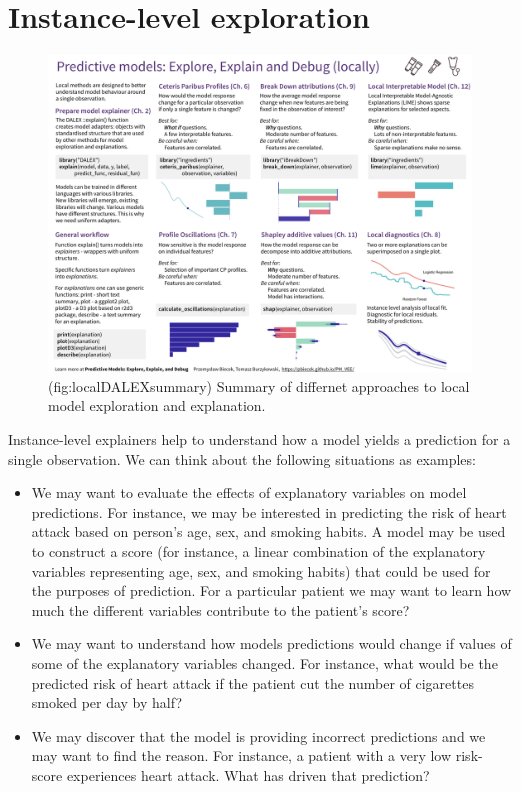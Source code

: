\documentclass[12pt,]{krantz}
\providecommand{\tightlist}{%
  \setlength{\itemsep}{0pt}\setlength{\parskip}{0pt}}
\begin{document}
\hypertarget{InstanceLevelExploration}{%
\section{Instance-level exploration}\label{InstanceLevelExploration}}

\begin{figure}

{\centering \includegraphics[width=0.99\linewidth]{figure/cheatsheet_local_explainers} 

}

\caption{(fig:localDALEXsummary) Summary of differnet approaches to local model exploration and explanation.}\label{fig:localDALEXsummary}
\end{figure}

Instance-level explainers help to understand how a model yields a prediction for a single observation. We can think about the following situations as examples:

\begin{itemize}
\tightlist
\item
  We may want to evaluate the effects of explanatory variables on model predictions. For instance, we may be interested in predicting the risk of heart attack based on person's age, sex, and smoking habits. A model may be used to construct a score (for instance, a linear combination of the explanatory variables representing age, sex, and smoking habits) that could be used for the purposes of prediction. For a particular patient we may want to learn how much the different variables contribute to the patient's score?
\item
  We may want to understand how models predictions would change if values of some of the explanatory variables changed. For instance, what would be the predicted risk of heart attack if the patient cut the number of cigarettes smoked per day by half?
\item
  We may discover that the model is providing incorrect predictions and we may want to find the reason. For instance, a patient with a very low risk-score experiences heart attack. What has driven that prediction?
\end{itemize}
\end{document}
